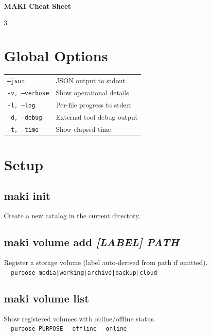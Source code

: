 \documentclass[a4paper,landscape,8pt]{article}
\newcommand{\cmd}[1]{\texttt{\footnotesize #1}}
\newcommand{\opt}[1]{\texttt{\scriptsize\color{maki-stone} #1}}
\begin{document}

\begin{center}
{\Large\bfseries\color{maki-salmon} MAKI Cheat Sheet} 
\end{center}
\vspace{-4pt}

\begin{multicols}{3}

\section{Global Options}
\begin{tabularx}{\columnwidth}{@{}lX@{}}
\cmd{--json} & JSON output to stdout \\
\cmd{-v, --verbose} & Show operational details \\
\cmd{-l, --log} & Per-file progress to stderr \\
\cmd{-d, --debug} & External tool debug output \\
\cmd{-t, --time} & Show elapsed time \\
\end{tabularx}

\section{Setup}

\subsection{maki init}
Create a new catalog in the current directory.

\subsection{maki volume add \textit{[LABEL] PATH}}
Register a storage volume (label auto-derived from path if omitted). \\
\opt{--purpose media|working|archive|backup|cloud}

\subsection{maki volume list}
Show registered volumes with online/offline status. \\
\opt{--purpose PURPOSE} \opt{--offline} \opt{--online}


\end{multicols}
\end{document}
